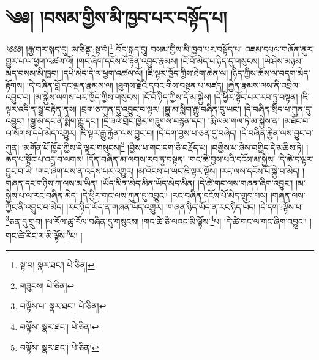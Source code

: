 \setcounter{footnote}{0} 
\chapter{༄༅། །བསམ་གྱིས་མི་ཁྱབ་པར་བསྟོད་པ།}༄༅༅། །རྒྱ་གར་སྐད་དུ། ཨ་ཙིནྟ་:སྟ་བཾ།\footnote{སྟ་བ།  སྣར་ཐང་།  པེ་ཅིན། } བོད་སྐད་དུ། བསམ་གྱིས་མི་ཁྱབ་པར་བསྟོད་པ། འཇམ་དཔལ་གཞོན་ནུར་གྱུར་པ་ལ་ཕྱག་འཚལ་ལོ། །གང་ཞིག་དངོས་པོ་རྟེན་འབྱུང་རྣམས། །ངོ་བོ་མེད་པ་ཉིད་དུ་གསུངས། །ཡེ་ཤེས་མཉམ་མེད་བསམ་མི་ཁྱབ། །དཔེ་མེད་དེ་ལ་ཕྱག་འཚལ་ལོ། །ཇི་ལྟར་ཁྱོད་ཀྱིས་ཐེག་ཆེན་ལ། །ཉིད་ཀྱིས་ཆོས་ལ་བདག་མེད་རྟོགས། །དེ་བཞིན་བློ་དང་ལྡན་རྣམས་ལ། །ཐུགས་རྗེའི་དབང་གིས་བསྟན་པ་མཛད། །རྐྱེན་རྣམས་ལས་ནི་འབྲེལ་འབྱུང་བ། །མ་སྐྱེས་ལགས་པར་ཁྱོད་ཀྱིས་གསུངས། །ངོ་བོ་ཉིད་ཀྱིས་དེ་མ་སྐྱེས། །དེ་ཕྱིར་སྟོང་པར་རབ་ཏུ་བསྟན། །ཇི་ལྟར་འདི་ན་སྒྲ་བརྟེན་ནས། །བྲག་ཅ་ཀུན་དུ་འབྱུང་བ་ལྟར། །སྒྱུ་མ་སྨིག་རྒྱུ་བཞིན་དུ་ཡང་། །དེ་བཞིན་སྲིད་པ་ཀུན་དུ་འབྱུང་། །སྒྱུ་མ་དང་ནི་སྨིག་རྒྱུ་དང་། །དྲི་ཟའི་གྲོང་ཁྱེར་གཟུགས་བརྙན་དང་། །རྨི་ལམ་གལ་ཏེ་མ་སྐྱེས་ན། །མཐོང་བ་ལ་སོགས་དཔེ་མེད་འགྱུར། །ཇི་ལྟར་རྒྱུ་རྐྱེན་ལས་བྱུང་བ། །དེ་དག་བྱས་པ་ཅན་དུ་བཞེད། །དེ་བཞིན་རྐྱེན་ལས་བྱུང་བ་ཀུན། །མགོན་པོ་ཁྱོད་ཀྱིས་དེ་ལྟར་གསུངས།\footnote{གཟུངས།  པེ་ཅིན། } །བྱིས་པ་གང་དག་ཅི་བརྗོད་པ། །བགྱིས་པ་ཞེས་བགྱིད་དེ་མཆིས་ཏེ། །ཆད་པ་སྟོང་པ་འདྲ་བ་ལགས། །དོན་བཞིན་མ་ལགས་རབ་ཏུ་བསྟན། །གང་ཚེ་བྱས་པའི་དངོས་མ་སྐྱེས། །དེ་ཚེ་ད་ལྟར་བྱུང་བ་ཡི། །གང་ཞིག་པས་ན་འདས་པར་འགྱུར། །མ་འོངས་པ་ཡང་ཇི་ལྟར་ལྟོས། །རང་ལས་དངོས་པོ་སྐྱེ་བ་མེད། །གཞན་དང་གཉིས་ཀ་ལས་མ་ཡིན། །ཡོད་མིན་མེད་མིན་ཡོད་མེད་མིན། །དེ་ཚེ་གང་ལས་གཞན་ཞིག་འབྱུང་། །མ་སྐྱེས་པ་ལ་རང་བཞིན་མེད། །དེ་ཕྱིར་གང་ལས་ཀུན་དུ་འབྱུང་། །རང་བཞིན་དངོས་པོ་མེད་གྲུབ་པས། །གཞན་ལས་ཀྱང་ནི་འབྱུང་བ་མེད། །རང་ཉིད་ཡོད་ན་གཞན་ཡོད་འགྱུར། །གཞན་ཉིད་ཡོད་ན་རང་ཉིད་ཡོད། །དེ་དག་:ལྟོས་པ་\footnote{བལྟོས་པ་  སྣར་ཐང་།  པེ་ཅིན། }ཅན་དུ་གྲུབ། །ཕ་རོལ་ཚུ་རོལ་བཞིན་དུ་གསུངས། །གང་ཚེ་ཅི་ལའང་མི་ལྟོས་\footnote{བལྟོས་  སྣར་ཐང་།  པེ་ཅིན། }པ། །དེ་ཚེ་གང་ལ་གང་ཞིག་འབྱུང་། །གང་ཚེ་རིང་ལ་མི་ལྟོས་\footnote{བལྟོས་  སྣར་ཐང་།  པེ་ཅིན། }པ། །
